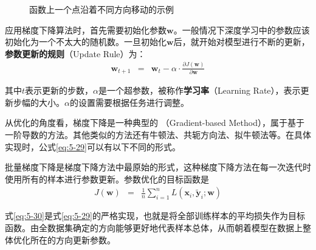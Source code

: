 \begin{figure}[htp]
\centering

\caption{函数上一个点沿着不同方向移动的示例}
\label{fig:5-43}
\end{figure}

\parinterval 应用梯度下降算法时，首先需要初始化参数$\mathbf{w}$。一般情况下深度学习中的参数应该初始化为一个不太大的随机数。一旦初始化$\mathbf{w}$后，就开始对模型进行不断的更新，{\small\sffamily\bfseries{参数更新的规则}}（Update Rule）为：
\begin{eqnarray}
\mathbf w_{t+1}&=&\mathbf w_{t}-\alpha \cdot \frac{\partial J(\mathbf w)}{\partial \mathbf w}
\label{eq:5-29}
\end{eqnarray}

\noindent 其中$t $表示更新的步数，$ \alpha $是一个超参数，被称作{\small\sffamily\bfseries{学习率}}（Learning Rate），表示更新步幅的大小。$ \alpha $的设置需要根据任务进行调整。

\parinterval 从优化的角度看，梯度下降是一种典型的 {\small{}}（Gradient-based Method），属于基于一阶导数的方法。其他类似的方法还有牛顿法、共轭方向法、拟牛顿法等。在具体实现时，公式\ref{eq:5-29}可以有以下不同的形式。\\

%

\vspace{0.5em}
\vspace{0.5em}

\parinterval 批量梯度下降是梯度下降方法中最原始的形式，这种梯度下降方法在每一次迭代时使用所有的样本进行参数更新。参数优化的目标函数是
\begin{eqnarray}
J(\mathbf w)&=&\frac{1}{n}\sum_{i=1}^{n}{L(\mathbf x_i,\mathbf {\widetilde y}_i;\mathbf w)}
\label{eq:5-30}
\end{eqnarray}

\parinterval 式\ref{eq:5-30}是式\ref{eq:5-29}的严格实现，也就是将全部训练样本的平均损失作为目标函数。由全数据集确定的方向能够更好地代表样本总体，从而朝着模型在数据上整体优化所在的方向更新参数。


